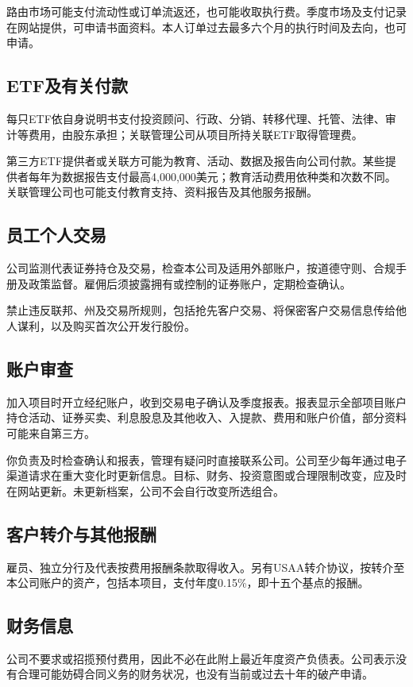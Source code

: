 \documentclass[UTF8,fontset=none,11pt,a4paper]{ctexart}
\begin{document}
路由市场可能支付流动性或订单流返还，也可能收取执行费。季度市场及支付记录在网站提供，可申请书面资料。本人订单过去最多六个月的执行时间及去向，也可申请。


\subsection*{ETF及有关付款}
每只ETF依自身说明书支付投资顾问、行政、分销、转移代理、托管、法律、审计等费用，由股东承担；关联管理公司从项目所持关联ETF取得管理费。


第三方ETF提供者或关联方可能为教育、活动、数据及报告向公司付款。某些提供者每年为数据报告支付最高4,000,000美元；教育活动费用依种类和次数不同。关联管理公司也可能支付教育支持、资料报告及其他服务报酬。


\subsection*{员工个人交易}
公司监测代表证券持仓及交易，检查本公司及适用外部账户，按道德守则、合规手册及政策监督。雇佣后须披露拥有或控制的证券账户，定期检查确认。


禁止违反联邦、州及交易所规则，包括抢先客户交易、将保密客户交易信息传给他人谋利，以及购买首次公开发行股份。


\subsection*{账户审查}
加入项目时开立经纪账户，收到交易电子确认及季度报表。报表显示全部项目账户持仓活动、证券买卖、利息股息及其他收入、入提款、费用和账户价值，部分资料可能来自第三方。


你负责及时检查确认和报表，管理有疑问时直接联系公司。公司至少每年通过电子渠道请求在重大变化时更新信息。目标、财务、投资意图或合理限制改变，应及时在网站更新。未更新档案，公司不会自行改变所选组合。


\subsection*{客户转介与其他报酬}
雇员、独立分行及代表按费用报酬条款取得收入。另有USAA转介协议，按转介至本公司账户的资产，包括本项目，支付年度0.15\%，即十五个基点的报酬。


\subsection*{财务信息}
公司不要求或招揽预付费用，因此不必在此附上最近年度资产负债表。公司表示没有合理可能妨碍合同义务的财务状况，也没有当前或过去十年的破产申请。
\end{document}
